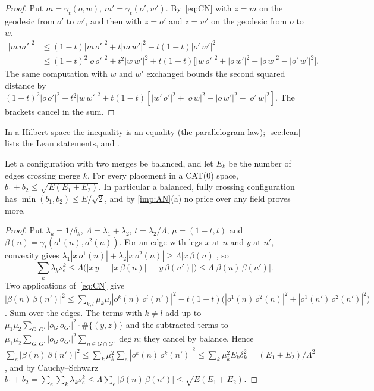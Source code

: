 \documentclass[10pt]{amsart}
\theoremstyle{plain}
\theoremstyle{definition}
\theoremstyle{remark}
\numberwithin{equation}{section}
\newcommand{\dd}[2]{|#1\,#2|}
\newcommand{\stP}{proved here}
\begin{document}
\begin{proof}
Put $m=\gamma_t(o,w)$, $m'=\gamma_t(o',w')$. By~\eqref{eq:CN} with $z=m$ on the geodesic from $o'$ to
$w'$, and then with $z=o'$ and $z=w'$ on the geodesic from $o$ to $w$,
\begin{align*}
\dd m{m'}^2&\le(1-t)\dd m{o'}^2+t\dd m{w'}^2-t(1-t)\dd{o'}{w'}^2\\
&\le(1-t)^2\dd o{o'}^2+t^2\dd w{w'}^2+t(1-t)\bigl[\dd w{o'}^2+\dd o{w'}^2-\dd ow^2-\dd{o'}{w'}^2\bigr].
\end{align*}
The same computation with $w$ and $w'$ exchanged bounds the second squared distance by
$(1-t)^2\dd o{o'}^2+t^2\dd w{w'}^2+t(1-t)[\dd{w'}{o'}^2+\dd ow^2-\dd o{w'}^2-\dd{o'}w^2]$. The
brackets cancel in the sum.
\end{proof}

In a Hilbert space the inequality is an equality (the parallelogram law); \cref{sec:lean} lists the
Lean statements,  and .

\begin{theorem}[two-merge cap; \stP]\label{thm:cap2}
Let a configuration with two merges be balanced, and let $E_k$ be the number of edges crossing merge
$k$. For every placement in a CAT(0) space, $b_1+b_2\le\sqrt{E(E_1+E_2)}$. In particular a balanced,
fully crossing configuration has $\min(b_1,b_2)\le E/\sqrt2$, and by \cref{imp:AN}(a) no price over any
field proves more.
\end{theorem}

\begin{proof}
Put $\lambda_k=1/\delta_k$, $\Lambda=\lambda_1+\lambda_2$, $t=\lambda_2/\Lambda$, $\mu=(1-t,t)$ and
$\beta(n)=\gamma_t(o^1(n),o^2(n))$. For an edge with legs $x$ at $n$ and $y$ at $n'$, convexity gives
$\lambda_1\dd x{o^1(n)}+\lambda_2\dd x{o^2(n)}\ge\Lambda\dd x{\beta(n)}$, so
\[
\textstyle\sum_k\lambda_ks^k_e\le\Lambda\bigl(\dd xy-\dd x{\beta(n)}-\dd y{\beta(n')}\bigr)\le\Lambda\dd
{\beta(n)}{\beta(n')}.
\]
Two applications of~\eqref{eq:CN} give
$\dd{\beta(n)}{\beta(n')}^2\le\sum_{k,l}\mu_k\mu_l\dd{o^k(n)}{o^l(n')}^2-t(1-t)\bigl(\dd{o^1(n)}{o^2(n)}^2+
\dd{o^1(n')}{o^2(n')}^2\bigr)$. Sum over the edges. The terms with $k\ne l$ add up to
$\mu_1\mu_2\sum_{G,G'}\dd{o_G}{o_{G'}}^2\cdot\#\{(y,z)\}$ and the subtracted terms to
$\mu_1\mu_2\sum_{G,G'}\dd{o_G}{o_{G'}}^2\sum_{n\in G\cap G'}\deg n$; they cancel by balance. Hence
$\sum_e\dd{\beta(n)}{\beta(n')}^2\le\sum_k\mu_k^2\sum_e\dd{o^k(n)}{o^k(n')}^2\le\sum_k\mu_k^2E_k\delta_k^2
=(E_1+E_2)/\Lambda^2$, and by Cauchy--Schwarz
$b_1+b_2=\sum_e\sum_k\lambda_ks^k_e\le\Lambda\sum_e\dd{\beta(n)}{\beta(n')}\le\sqrt{E(E_1+E_2)}$.
\end{proof}
\end{document}
